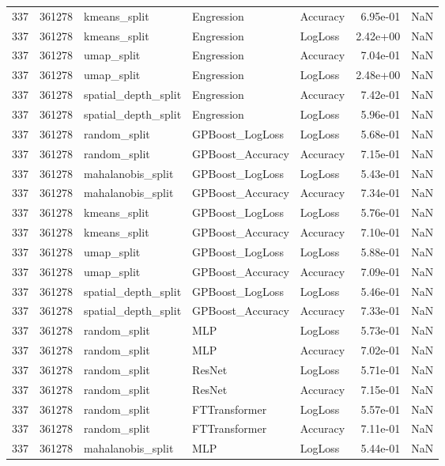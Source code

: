 \begin{tabular}{rrlllrr}
337 & 361278 & kmeans\_split & Engression & Accuracy & 6.95e-01 & NaN \\
337 & 361278 & kmeans\_split & Engression & LogLoss & 2.42e+00 & NaN \\
337 & 361278 & umap\_split & Engression & Accuracy & 7.04e-01 & NaN \\
337 & 361278 & umap\_split & Engression & LogLoss & 2.48e+00 & NaN \\
337 & 361278 & spatial\_depth\_split & Engression & Accuracy & 7.42e-01 & NaN \\
337 & 361278 & spatial\_depth\_split & Engression & LogLoss & 5.96e-01 & NaN \\
337 & 361278 & random\_split & GPBoost\_LogLoss & LogLoss & 5.68e-01 & NaN \\
337 & 361278 & random\_split & GPBoost\_Accuracy & Accuracy & 7.15e-01 & NaN \\
337 & 361278 & mahalanobis\_split & GPBoost\_LogLoss & LogLoss & 5.43e-01 & NaN \\
337 & 361278 & mahalanobis\_split & GPBoost\_Accuracy & Accuracy & 7.34e-01 & NaN \\
337 & 361278 & kmeans\_split & GPBoost\_LogLoss & LogLoss & 5.76e-01 & NaN \\
337 & 361278 & kmeans\_split & GPBoost\_Accuracy & Accuracy & 7.10e-01 & NaN \\
337 & 361278 & umap\_split & GPBoost\_LogLoss & LogLoss & 5.88e-01 & NaN \\
337 & 361278 & umap\_split & GPBoost\_Accuracy & Accuracy & 7.09e-01 & NaN \\
337 & 361278 & spatial\_depth\_split & GPBoost\_LogLoss & LogLoss & 5.46e-01 & NaN \\
337 & 361278 & spatial\_depth\_split & GPBoost\_Accuracy & Accuracy & 7.33e-01 & NaN \\
337 & 361278 & random\_split & MLP & LogLoss & 5.73e-01 & NaN \\
337 & 361278 & random\_split & MLP & Accuracy & 7.02e-01 & NaN \\
337 & 361278 & random\_split & ResNet & LogLoss & 5.71e-01 & NaN \\
337 & 361278 & random\_split & ResNet & Accuracy & 7.15e-01 & NaN \\
337 & 361278 & random\_split & FTTransformer & LogLoss & 5.57e-01 & NaN \\
337 & 361278 & random\_split & FTTransformer & Accuracy & 7.11e-01 & NaN \\
337 & 361278 & mahalanobis\_split & MLP & LogLoss & 5.44e-01 & NaN \\

\end{tabular}
